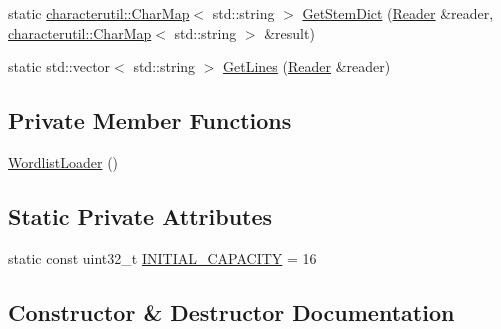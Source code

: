 \begin{DoxyCompactItemize}
static \mbox{\hyperlink{classlucene_1_1core_1_1analysis_1_1characterutil_1_1CharMap}{characterutil\+::\+Char\+Map}}$<$ std\+::string $>$ \mbox{\hyperlink{classlucene_1_1core_1_1analysis_1_1WordlistLoader_abefbb47cbb9b31c92d4f4b0a55f7f258}{Get\+Stem\+Dict}} (\mbox{\hyperlink{classlucene_1_1core_1_1analysis_1_1Reader}{Reader}} \&reader, \mbox{\hyperlink{classlucene_1_1core_1_1analysis_1_1characterutil_1_1CharMap}{characterutil\+::\+Char\+Map}}$<$ std\+::string $>$ \&result)
\item 
static std\+::vector$<$ std\+::string $>$ \mbox{\hyperlink{classlucene_1_1core_1_1analysis_1_1WordlistLoader_aa33dab48a9ce69a8b36dea4a7caa7de8}{Get\+Lines}} (\mbox{\hyperlink{classlucene_1_1core_1_1analysis_1_1Reader}{Reader}} \&reader)
\end{DoxyCompactItemize}
\subsection*{Private Member Functions}
\begin{DoxyCompactItemize}
\item 
\mbox{\hyperlink{classlucene_1_1core_1_1analysis_1_1WordlistLoader_a19b09865a0d3f9783ce84e5bca3e8481}{Wordlist\+Loader}} ()
\end{DoxyCompactItemize}
\subsection*{Static Private Attributes}
\begin{DoxyCompactItemize}
\item 
static const uint32\+\_\+t \mbox{\hyperlink{classlucene_1_1core_1_1analysis_1_1WordlistLoader_a903bb8e9044b6ce1c4e09ffe405344b8}{I\+N\+I\+T\+I\+A\+L\+\_\+\+C\+A\+P\+A\+C\+I\+TY}} = 16
\end{DoxyCompactItemize}


\subsection{Constructor \& Destructor Documentation}
\mbox{\label{classlucene_1_1core_1_1analysis_1_1WordlistLoader_a19b09865a0d3f9783ce84e5bca3e8481}} 

